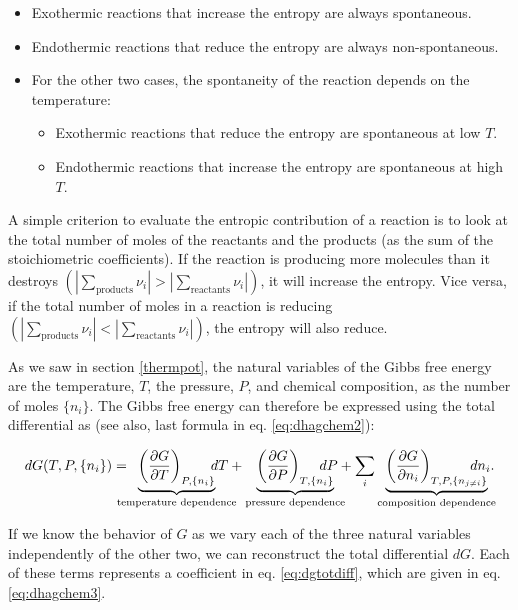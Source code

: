 \documentclass[
  9pt,
]{extbook}
\providecommand{\tightlist}{%
  \setlength{\itemsep}{0pt}\setlength{\parskip}{0pt}}
\theoremstyle{definition}
\theoremstyle{definition}
\theoremstyle{definition}
\theoremstyle{remark}
\begin{document}
\begin{itemize}
\tightlist
\item
  Exothermic reactions that increase the entropy are always spontaneous.
\item
  Endothermic reactions that reduce the entropy are always non-spontaneous.
\item
  For the other two cases, the spontaneity of the reaction depends on the temperature:

  \begin{itemize}
  \tightlist
  \item
    Exothermic reactions that reduce the entropy are spontaneous at low \(T\).
  \item
    Endothermic reactions that increase the entropy are spontaneous at high \(T\).
  \end{itemize}
\end{itemize}

A simple criterion to evaluate the entropic contribution of a reaction is to look at the total number of moles of the reactants and the products (as the sum of the stoichiometric coefficients). If the reaction is producing more molecules than it destroys \(\left( \left| \sum_\text{products} \nu_i \right| > \left| \sum_\text{reactants} \nu_i \right| \right)\), it will increase the entropy. Vice versa, if the total number of moles in a reaction is reducing \(\left( \left| \sum_\text{products} \nu_i \right| < \left| \sum_\text{reactants} \nu_i \right| \right)\), the entropy will also reduce.

As we saw in section \ref{thermpot}, the natural variables of the Gibbs free energy are the temperature, \(T\), the pressure, \(P\), and chemical composition, as the number of moles \(\{n_i\}\). The Gibbs free energy can therefore be expressed using the total differential as (see also, last formula in eq. \eqref{eq:dhagchem2}):

\begin{equation}
dG(T,P,\{n_i\}) = \mkern-18mu \underbrace{\left(\frac{\partial G}{\partial T} \right)_{P,\{n_i\}}}_{\text{temperature dependence}} \mkern-36mu dT + \underbrace{\left(\frac{\partial G}{\partial P} \right)_{T,\{n_i\}}}_{\text{pressure dependence}} \mkern-36mu dP + \sum_i \underbrace{\left(\frac{\partial G}{\partial n_i} \right)_{T,P,\{n_{j \neq i}\}}}_{\text{composition dependence}} \mkern-36mu dn_i.
\label{eq:dgtotdiff}
\end{equation}

If we know the behavior of \(G\) as we vary each of the three natural variables independently of the other two, we can reconstruct the total differential \(dG\). Each of these terms represents a coefficient in eq. \eqref{eq:dgtotdiff}, which are given in eq. \eqref{eq:dhagchem3}.
\end{document}
